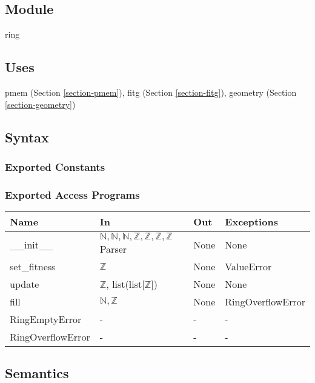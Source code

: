 \documentclass[12pt, titlepage]{article}
\begin{document}
\subsection{Module}

ring

\subsection{Uses}

pmem (Section \ref{section-pmem}),
fitg (Section \ref{section-fitg}),
geometry (Section \ref{section-geometry})

\subsection{Syntax}

\subsubsection{Exported Constants}

\subsubsection{Exported Access Programs}

\begin{center}
	\begin{tabular}{p{4cm} p{4cm} p{2cm} p{2cm}}
		\hline
		\textbf{Name} & \textbf{In} & \textbf{Out} & \textbf{Exceptions} \\
		\hline
		\_\_init\_\_ & $\mathbb{N}, \mathbb{N}, \mathbb{N}, \mathbb{Z}, 
		\mathbb{Z}, \mathbb{Z}, \mathbb{Z}$ Parser & None & None \\
		set\_fitness & $\mathbb{Z}$ & None & ValueError \\
		update & $\mathbb{Z}$, list(list[$\mathbb{Z}$]) & None & None \\
		fill & $\mathbb{N}, \mathbb{Z}$ & None & RingOverflowError \\
		RingEmptyError  & - & - & - \\
		RingOverflowError & - & - & - \\
		\hline
	\end{tabular}
\end{center}


\subsection{Semantics}
\end{document}
